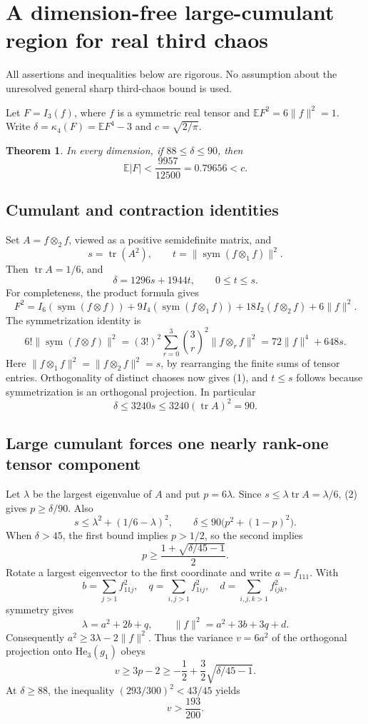 \documentclass{article}
\newtheorem{theorem}{Theorem}
\begin{document}
\section*{A dimension-free large-cumulant region for real third chaos}
All assertions and inequalities below are rigorous. No assumption about the
unresolved general sharp third-chaos bound is used.

Let $F=I_3(f)$, where $f$ is a symmetric real tensor and
$\mathbb EF^2=6\|f\|^2=1$. Write
$\delta=\kappa_4(F)=\mathbb EF^4-3$ and $c=\sqrt{2/\pi}$.

\begin{theorem}
In every dimension, if $88\le\delta\le90$, then
\[
 \mathbb E|F|<\frac{9957}{12500}=0.79656<c.
\]
\end{theorem}

\subsection*{Cumulant and contraction identities}
Set $A=f\otimes_2 f$, viewed as a positive semidefinite matrix, and
\[
 s=\operatorname{tr}(A^2),\qquad
 t=\|\operatorname{sym}(f\otimes_1 f)\|^2.
\]
Then $\operatorname{tr}A=1/6$, and
\[
 \delta=1296s+1944t,\qquad 0\le t\le s.
 \tag{1}
\]
For completeness, the product formula gives
\[
 F^2=I_6(\operatorname{sym}(f\otimes f))
 +9I_4(\operatorname{sym}(f\otimes_1f))
 +18I_2(f\otimes_2f)+6\|f\|^2.
\]
The symmetrization identity is
\[
 6!\|\operatorname{sym}(f\otimes f)\|^2
 =(3!)^2\sum_{r=0}^3\binom3r^2\|f\otimes_r f\|^2
 =72\|f\|^4+648s.
\]
Here $\|f\otimes_1f\|^2=\|f\otimes_2f\|^2=s$, by rearranging
the finite sums of tensor entries. Orthogonality of distinct chaoses now gives
(1), and $t\le s$ follows because symmetrization is an orthogonal projection.
In particular
\[
 \delta\le3240s\le3240(\operatorname{tr}A)^2=90.
 \tag{2}
\]

\subsection*{Large cumulant forces one nearly rank-one tensor component}
Let $\lambda$ be the largest eigenvalue of $A$ and put $p=6\lambda$.
Since $s\le\lambda\operatorname{tr}A=\lambda/6$, (2) gives
$p\ge\delta/90$. Also
\[
 s\le\lambda^2+(1/6-\lambda)^2,
 \qquad \delta\le90\bigl(p^2+(1-p)^2\bigr).
\]
When $\delta>45$, the first bound implies $p>1/2$, so the second implies
\[
 p\ge\frac{1+\sqrt{\delta/45-1}}{2}.
 \tag{3}
\]
Rotate a largest eigenvector to the first coordinate and write $a=f_{111}$.
With
\[
 b=\sum_{j>1}f_{11j}^2,\quad
 q=\sum_{i,j>1}f_{1ij}^2,\quad
 d=\sum_{i,j,k>1}f_{ijk}^2,
\]
symmetry gives
\[
 \lambda=a^2+2b+q,\qquad
 \|f\|^2=a^2+3b+3q+d.
\]
Consequently $a^2\ge3\lambda-2\|f\|^2$. Thus the variance
$v=6a^2$ of the orthogonal projection onto $\mathrm{He}_3(g_1)$ obeys
\[
 v\ge3p-2\ge-\frac12+\frac32\sqrt{\delta/45-1}.
 \tag{4}
\]
At $\delta\ge88$, the inequality $(293/300)^2<43/45$ yields
\[
 v>\frac{193}{200}.
 \tag{5}
\]
\end{document}
